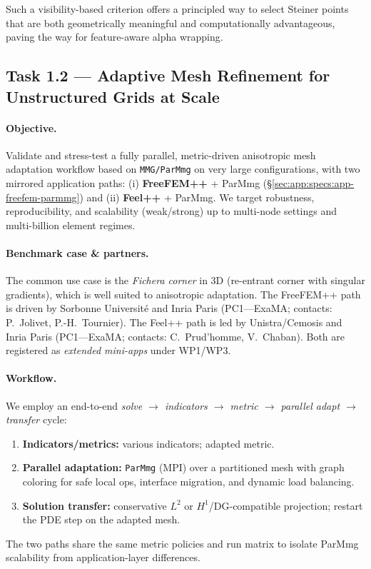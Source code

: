 Such a visibility-based criterion offers a principled way to select Steiner points that are both geometrically meaningful and computationally advantageous, paving the way for feature-aware alpha wrapping.

\subsection{Task 1.2 — Adaptive Mesh Refinement for Unstructured Grids at Scale}
\label{sec:wp1:t1.2}

\paragraph{Objective.}
Validate and stress-test a fully parallel, metric-driven anisotropic mesh adaptation workflow based on \texttt{MMG/ParMmg} on very large configurations, with two mirrored application paths:
(i) \textbf{FreeFEM++} + ParMmg (\S\ref{sec:app:specs:app-freefem-parmmg}) and
(ii) \textbf{Feel++} + ParMmg.
We target robustness, reproducibility, and scalability (weak/strong) up to multi-node settings and multi-billion element regimes.

\paragraph{Benchmark case \& partners.}
The common use case is the \emph{Fichera corner} in 3D (re-entrant corner with singular gradients), which is well suited to anisotropic adaptation.
The FreeFEM++ path is driven by Sorbonne Université and Inria Paris (PC1—ExaMA; contacts: P.~Jolivet, P.-H.~Tournier).
The Feel++ path is led by Unistra/Cemosis and Inria Paris (PC1—ExaMA; contacts: C.~Prud’homme, V.~Chaban).
Both are registered as \emph{extended mini-apps} under WP1/WP3.

\paragraph{Workflow.}
We employ an end-to-end \emph{solve $\rightarrow$ indicators $\rightarrow$ metric $\rightarrow$ parallel adapt $\rightarrow$ transfer} cycle:
\begin{enumerate}
  \item \textbf{Indicators/metrics:} various indicators; adapted metric.
  \item \textbf{Parallel adaptation:} \texttt{ParMmg} (MPI) over a partitioned mesh with graph coloring for safe local ops, interface migration, and dynamic load balancing.
  \item \textbf{Solution transfer:} conservative $L^2$ or $H^1$/DG-compatible projection; restart the PDE step on the adapted mesh.
\end{enumerate}
The two paths share the same metric policies and run matrix to isolate ParMmg scalability from application-layer differences.


